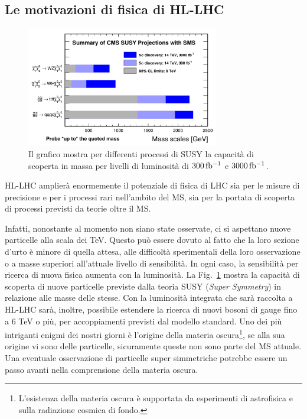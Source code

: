 \subsection{Le motivazioni di fisica di HL-LHC}
\begin{figure}
\centering
\includegraphics[width=0.75\textwidth]{Immagini/SUSY}
\caption{Il grafico mostra per differenti processi di SUSY la capacità di scoperta in massa per livelli di luminosità di $300{\rm \, fb^{-1}}$ e $3000{\rm \, fb^{-1}}$. %
}
\label{SUSY}
\end{figure}
HL-LHC amplier\`a enormemente il potenziale di fisica di LHC sia per le misure di precisione e per i processi rari nell'ambito del MS, sia per la portata di scoperta di processi previsti da teorie oltre il MS.

Infatti, nonostante al momento non siano state osservate, ci si aspettano nuove particelle alla scala dei TeV. 
Questo può essere dovuto al fatto che la loro sezione d'urto è minore di quella attesa, alle difficoltà sperimentali della loro osservazione o a masse superiori all'attuale livello di sensibilità. 
In ogni caso, la sensibilità per ricerca di nuova fisica aumenta con la luminosità. La Fig.~\ref{SUSY} mostra la capacità di scoperta di nuove particelle previste dalla teoria SUSY ({\em Super Symmetry}) in relazione alle masse delle stesse. 
Con la luminosità integrata che sarà raccolta a HL-LHC sarà, inoltre, possibile estendere la ricerca di nuovi bosoni di gauge fino a 6 TeV o più, per accoppiamenti previsti dal modello standard. 
Uno dei più intriganti enigmi dei nostri giorni è l'origine della materia oscura\footnote{L'esistenza della materia oscura è supportata da esperimenti di astrofisica e sulla radiazione cosmica di fondo.}, se alla sua origine vi sono delle particelle, sicuramente queste non sono parte del MS attuale. 
Una eventuale osservazione di particelle super simmetriche potrebbe essere un passo avanti nella comprensione della materia oscura. 

